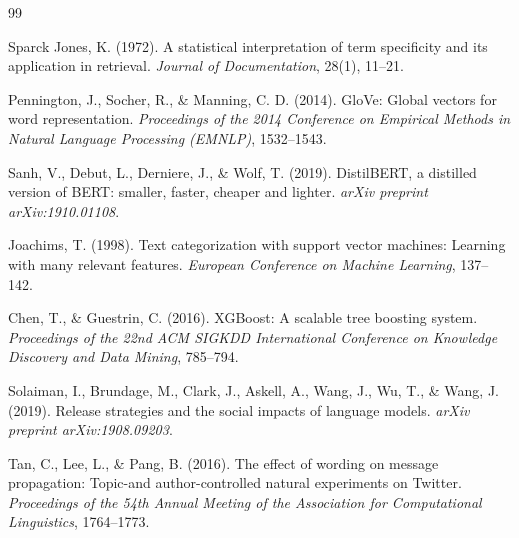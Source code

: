 \documentclass[12pt, a4paper]{article}
\begin{document}
\newpage
\begin{thebibliography}{99}

 Sparck Jones, K. (1972). A statistical interpretation of term specificity and its application in retrieval. \textit{Journal of Documentation}, 28(1), 11--21.

 Pennington, J., Socher, R., \& Manning, C. D. (2014). GloVe: Global vectors for word representation. \textit{Proceedings of the 2014 Conference on Empirical Methods in Natural Language Processing (EMNLP)}, 1532--1543.

 Sanh, V., Debut, L., Derniere, J., \& Wolf, T. (2019). DistilBERT, a distilled version of BERT: smaller, faster, cheaper and lighter. \textit{arXiv preprint arXiv:1910.01108}.

 Joachims, T. (1998). Text categorization with support vector machines: Learning with many relevant features. \textit{European Conference on Machine Learning}, 137--142.

 Chen, T., \& Guestrin, C. (2016). XGBoost: A scalable tree boosting system. \textit{Proceedings of the 22nd ACM SIGKDD International Conference on Knowledge Discovery and Data Mining}, 785--794.

 Solaiman, I., Brundage, M., Clark, J., Askell, A., Wang, J., Wu, T., \& Wang, J. (2019). Release strategies and the social impacts of language models. \textit{arXiv preprint arXiv:1908.09203}.

 Tan, C., Lee, L., & Pang, B. (2016). The effect of wording on message propagation: Topic-and author-controlled natural experiments on Twitter. \textit{Proceedings of the 54th Annual Meeting of the Association for Computational Linguistics}, 1764--1773.


\end{thebibliography}
\end{document}
